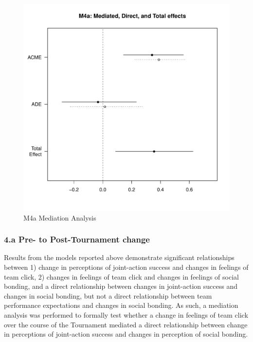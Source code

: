 \begin{landscape}
  \begin{figure}[htbp]
    \centering
    \includegraphics[scale = .5]{images/MLM4aMediationEffects.pdf}
    \caption{M4a Mediation Analysis}
    \label{fig:MLM4aMediationAnalysis}
  \end{figure}

  \subsubsection{4.a Pre- to Post-Tournament change}


  Results from the models reported above demonstrate significant relationships between 1) change in perceptions of joint-action success and changes in feelings of team click, 2) changes in feelings of team click and changes in feelings of social bonding, and a direct relationship between changes in joint-action success and changes in social bonding, but not a direct relationship between team performance expectations and changes in social bonding. As such, a mediation analysis was performed to formally test whether a change in feelings of team click over the course of the Tournament mediated a direct relationship between change in perceptions of joint-action success and changes in perception of social bonding.\\


\end{landscape}
